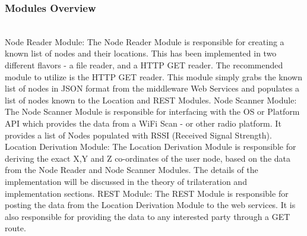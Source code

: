 \documentclass[conference]{IEEEtran}
\begin{document}
\subsubsection{Modules Overview}
\rule[-10pt]{0pt}{10pt}\\
 Node Reader Module:
\newline
The Node Reader Module is responsible for creating a known list of nodes and their locations.  This has been implemented in two different flavors - a file reader, and a HTTP GET reader. The recommended module to utilize is the HTTP GET reader. This module simply grabs the known list of nodes in JSON format from the middleware Web Services and populates a list of nodes known to the Location and REST Modules.
\newline
\newline
Node Scanner Module:
\newline
The Node Scanner Module is responsible for interfacing with the OS or Platform API which provides the data from a WiFi Scan - or other radio platform. It provides a list of Nodes populated with RSSI (Received Signal Strength).
\newline
\newline
Location Derivation Module:
\newline
The Location Derivation Module is responsible for deriving the exact X,Y and Z co-ordinates of the user node, based on the data from the Node Reader and Node Scanner Modules. The details of the implementation will be discussed in the theory of trilateration and implementation sections.
\newline
\newline
REST Module:
\newline
The REST Module is responsible for posting the data from the Location Derivation Module to the web services. It is also responsible for providing the data to any interested party through a GET route.
\newline
\end{document}
